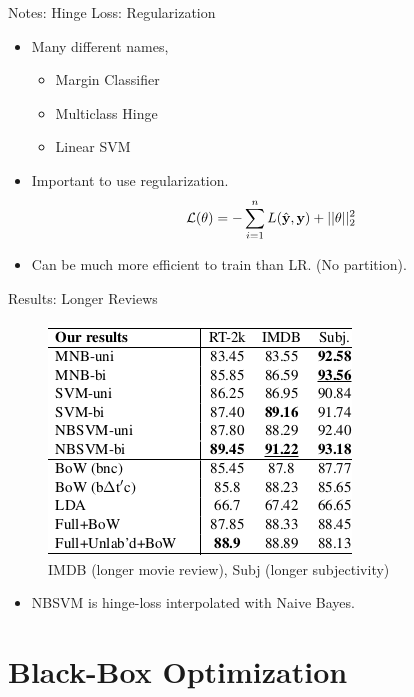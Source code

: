 \documentclass{beamer}
\begin{document}
\begin{frame}{Notes: Hinge Loss: Regularization}
  \begin{itemize}
  \item   Many different names,
  \begin{itemize}
  \item Margin Classifier
  \item Multiclass Hinge
  \item Linear SVM
  \end{itemize}

  \item Important to use regularization.  
  \[ \mathcal{L}(\theta) = - \sum_{i=1}^n L(\hat{\mathbf{y}}, \mathbf{y}) + ||\theta||^2_2\] 

  \item Can be much more efficient to train than LR. (No partition).

  \end{itemize}
\end{frame}

\begin{frame}{Results: Longer Reviews}
  \begin{figure}
    \centering
    \includegraphics{svm}
    \caption{IMDB (longer movie review), Subj (longer subjectivity)}
  \end{figure}

  \begin{itemize}
  \item NBSVM is hinge-loss interpolated with Naive Bayes.
  \end{itemize}
\end{frame}


\section{Black-Box Optimization}


\end{document}
